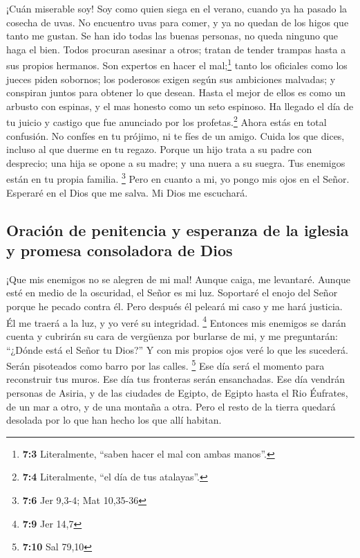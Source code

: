  ¡Cuán miserable soy! Soy como quien siega en el verano,
cuando ya ha pasado la cosecha de uvas. No encuentro uvas para comer, y
ya no quedan de los higos que tanto me gustan.  Se han ido
todas las buenas personas, no queda ninguno que haga el bien. Todos
procuran asesinar a otros; tratan de tender trampas hasta a sus propios
hermanos.  Son expertos en hacer el mal;\footnote{\textbf{7:3}
  Literalmente, ``saben hacer el mal con ambas manos''.} tanto los
oficiales como los jueces piden sobornos; los poderosos exigen según sus
ambiciones malvadas; y conspiran juntos para obtener lo que desean.
 Hasta el mejor de ellos es como un arbusto con espinas, y
el mas honesto como un seto espinoso. Ha llegado el día de tu juicio y
castigo que fue anunciado por los profetas.\footnote{\textbf{7:4}
  Literalmente, ``el día de tus atalayas''.} Ahora estás en total
confusión.  No confíes en tu prójimo, ni te fíes de un
amigo. Cuida los que dices, incluso al que duerme en tu regazo.
 Porque un hijo trata a su padre con desprecio; una hija
se opone a su madre; y una nuera a su suegra. Tus enemigos están en tu
propia familia. \footnote{\textbf{7:6} Jer 9,3-4; Mat 10,35-36}
 Pero en cuanto a mi, yo pongo mis ojos en el Señor.
Esperaré en el Dios que me salva. Mi Dios me escuchará.

\hypertarget{oraciuxf3n-de-penitencia-y-esperanza-de-la-iglesia-y-promesa-consoladora-de-dios}{%
\subsection{Oración de penitencia y esperanza de la iglesia y promesa
consoladora de
Dios}\label{oraciuxf3n-de-penitencia-y-esperanza-de-la-iglesia-y-promesa-consoladora-de-dios}}

 ¡Que mis enemigos no se alegren de mi mal! Aunque caiga,
me levantaré. Aunque esté en medio de la oscuridad, el Señor es mi luz.
 Soportaré el enojo del Señor porque he pecado contra él.
Pero después él peleará mi caso y me hará justicia. Él me traerá a la
luz, y yo veré su integridad. \footnote{\textbf{7:9} Jer 14,7}
 Entonces mis enemigos se darán cuenta y cubrirán su cara
de vergüenza por burlarse de mi, y me preguntarán: ``¿Dónde está el
Señor tu Dios?'' Y con mis propios ojos veré lo que les sucederá. Serán
pisoteados como barro por las calles. \footnote{\textbf{7:10} Sal 79,10}
 Ese día será el momento para reconstruir tus muros. Ese
día tus fronteras serán ensanchadas.  Ese día vendrán
personas de Asiria, y de las ciudades de Egipto, de Egipto hasta el Rio
Éufrates, de un mar a otro, y de una montaña a otra. 
Pero el resto de la tierra quedará desolada por lo que han hecho los que
allí habitan.

